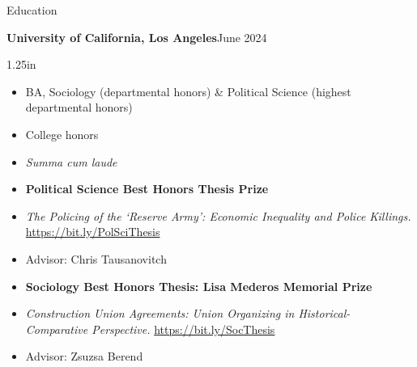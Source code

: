 \documentclass[
	12pt, %
]{resume} %
\newcommand{\righthandindent}{1.25in}
\begin{document}
\begin{rSection}{Education}

\textbf{University of California, Los Angeles}\hfill June 2024
\begin{adjustwidth}{0pt}{\righthandindent}
\vspace{-7pt}
\begin{itemize}
    \item[] BA, Sociology (departmental honors) \& Political Science (highest departmental honors)
    \item[] College honors
    \vspace{-7pt}
    \item[] \textit{Summa cum laude}
    \item[] \textbf{Political Science Best Honors Thesis Prize}
    \vspace{-7pt}
    \item[] \textit{The Policing of the `Reserve Army': Economic Inequality and Police Killings.} \href{https://bit.ly/PolSciThesis}{https://bit.ly/PolSciThesis}
    \vspace{-7pt}
    \item[] Advisor: Chris Tausanovitch
    \item[] \textbf{Sociology Best Honors Thesis: Lisa Mederos Memorial Prize}
    \vspace{-21pt}
    \item[] \textit{Construction Union Agreements: Union Organizing in Historical- \allowbreak Comparative Perspective.} \href{https://bit.ly/SocThesis}{https://bit.ly/SocThesis}
    \vspace{-7pt}
    \item[] Advisor: Zsuzsa Berend

\end{itemize}
\end{adjustwidth}


\end{rSection}
\end{document}
